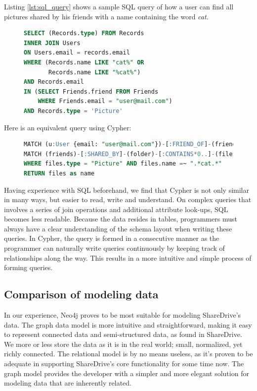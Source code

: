 \documentclass[a4paper, 12pt, conference]{IEEEtran}
\begin{document}
Listing \ref{lst:sql_query} shows a sample SQL query of how a user can find all pictures shared by his friends with a name containing the word \textit{cat}.


\begin{figure}
\begin{lstlisting}[caption=SQL Query, language=sql, basicstyle=\small, xleftmargin=.1\textwidth, xrightmargin=.1\textwidth, frame=tb, label={lst:sql_query}]
SELECT (Records.type) FROM Records 
INNER JOIN Users 
ON Users.email = records.email 
WHERE (Records.name LIKE "cat%" OR 
       Records.name LIKE "%cat%") 
AND Records.email
IN (SELECT Friends.friend FROM Friends 
    WHERE Friends.email = "user@mail.com") 
AND Records.type = 'Picture'
\end{lstlisting}
\end{figure}
Here is an equivalent query using Cypher:
\begin{figure}
\begin{lstlisting}[caption=Cypher Query , language=sql, basicstyle=\small,
xleftmargin=.1\textwidth, xrightmargin=.1\textwidth, frame=tb, morekeywords={RETURN}, label={lst:cypher_query}]
MATCH (u:User {email: "user@mail.com"})-[:FRIEND_OF]-(friends)
MATCH (friends)-[:SHARED_BY]-(folder)-[:CONTAINS*0..]-(files:File)
WHERE files.type = "Picture" AND files.name =~ ".*cat.*"
RETURN files as name
\end{lstlisting}
\end{figure}
Having experience with SQL beforehand, we find that Cypher is not only similar in many ways, but easier to read, write and understand. 
On complex queries that involves a series of join operations and additional attribute look-ups, SQL becomes less readable. 
Because the data resides in tables, programmers must always have a clear understanding of the schema layout when writing these queries. 
In Cypher, the query is formed in a consecutive manner as the programmer can naturally write queries continuously by keeping track of relationships along the way. This results in a more intuitive and simple process of forming queries.

\subsection{Comparison of modeling data}
In our experience, Neo4j proves to be most suitable for modeling ShareDrive's data. The graph data model is more intuitive and straightforward, making it easy to represent connected data and semi-structured data, as found in ShareDrive. 
We more or less store the data as it is in the real world; small, normalized, yet richly connected. 
The relational model is by no means useless, as it's proven to be adequate in supporting ShareDrive's core functionality for some time now. 
The graph model provides the developer with a simpler and more elegant solution for modeling data that are inherently related.
\end{document}
